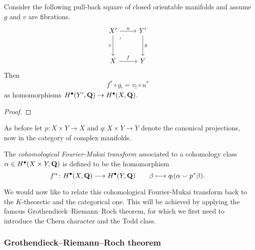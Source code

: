 \begin{proposition}
    Consider the following pull-back square of closed orientable manifolds and assume $g$ and $v$ are fibrations.
    \[\begin{tikzcd}[row sep = 3em]
        {X'} & {Y'} \\
        X & Y
        \arrow["u", from=1-1, to=1-2]
        \arrow["v"', from=1-1, to=2-1]
        \arrow["\lrcorner"{anchor=center, pos=0.125}, draw=none, from=1-1, to=2-2]
        \arrow["g", from=1-2, to=2-2]
        \arrow["f", from=2-1, to=2-2]
    \end{tikzcd}\]
    Then
    \begin{equation}
        \label{eq: cohomological base change}
        f^* \circ g_! = v_! \circ u^* 
    \end{equation}
    as homomorphisms $H^{\bullet}(Y', \mathbf Q) \to H^{\bullet}(X, \mathbf Q)$.
\end{proposition}

\begin{proof}
\end{proof}

As before let $p \colon X \times Y \to X$ and $q \colon X \times Y \to Y$ denote the canonical projections, now in the category of complex manifolds. 

\begin{definition}
    The \emph{cohomological Fourier-Mukai transform} associated to a cohomology class $\alpha \in H^{\bullet}(X \times Y, \mathbf Q)$ is defined to be the homomorphism
    \[
        f^\alpha \colon H^{\bullet}(X, \mathbf Q) \longrightarrow H^{\bullet}(Y, \mathbf Q) \qquad \beta \longmapsto q_!(\alpha \smallsmile p^*\beta).
    \]
\end{definition}

We would now like to relate this cohomological Fourier-Mukai transform back to the $K$-theoretic and the categorical one. This will be achieved by applying the famous Grothendieck--Riemann--Roch theorem, 
for which we first need to introduce the Chern character and the Todd class. 

\subsubsection*{Grothendieck--Riemann--Roch theorem}

